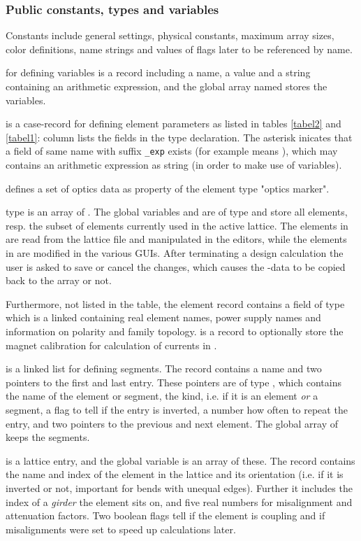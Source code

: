 \documentclass[12pt]{article}
\newcommand\code[1]{{\tt #1}}
\newcommand{\unico}[1]{{\color{burntorange}\code{#1}}}
\newcommand{\opagui}[1]{\colorbox{blue!20}{{\color{black}\code{#1}}}}
\newcommand{\ogui}[1]{\hyperref[#1]{\opagui{#1}}}
\newcommand{\pvar}[1]{\subsubsection*{Public constants, types and variables} #1}
\begin{document}
\pvar{}
Constants include general settings, physical constants, maximum array sizes, color definitions, name strings and values of flags later to be referenced by name.

\unico{Variable\_type} for defining variables is a record including a name, a value and a string containing an arithmetic expression, and the global array named \unico{Variable} stores the variables. 

\unico{ElementType} is a case-record for defining element parameters as listed in tables \ref{tabel2} and \ref{tabel1}: column \unico{in record} lists the fields in the type declaration. The asterisk inicates that a field of same name with suffix \code{\_exp} exists (for example \unico{l*} means \unico{l\_exp}), which may contains an arithmetic expression as string (in order to make use of variables).

\unico{OmarkType} defines a set of optics data as property of the element type "optics marker".

\unico{ElemArr} type is an array of \unico{ElementType}. 
The global variables \unico{Elem} and \unico{Ella} are of type \unico{ElemArr} and store all elements, resp. the subset of elements currently used in the active lattice. The elements in \unico{Elem} are read from the lattice file and manipulated in the editors, while the elements in \unico{Ella} are modified in the various GUIs. After terminating a design calculation the user is asked to save or cancel the changes, which causes the \unico{Ella}-data to be copied back to the \unico{Elem} array or not.

Furthermore, not listed in the table, the element record contains a field \unico{nl} of type \unico{NameListType} which is a linked containing real element names, power supply names and information on polarity and family topology. 
\unico{calibrationType} is a record to optionally store the magnet calibration for calculation of currents in \ogui{opacurrents}.

\unico{Segment\_type} is a linked list for defining segments. The record contains a name and two pointers to the first and last entry. These pointers are of type \unico{AbstractElement\_type}, which contains the name of the element or segment, the kind, i.e. if it is an element {\em or} a segment, a flag to tell if the entry is inverted, a number how often to repeat the entry, and two pointers to the previous and next element. The global array \unico{Segm} of \unico{Segment\_type} keeps the segments.

\unico{LatticeType} is a lattice entry, and the global variable \unico{Lattice} is an array of these. The record contains the name and index of the element in the lattice and its orientation (i.e. if it is inverted or not, important for bends with unequal edges). Further it includes the index of a {\em girder} the element sits on, and five real numbers for misalignment and attenuation factors. Two boolean flags tell if the element is coupling and if misalignments were set to speed up calculations later. 
\end{document}
